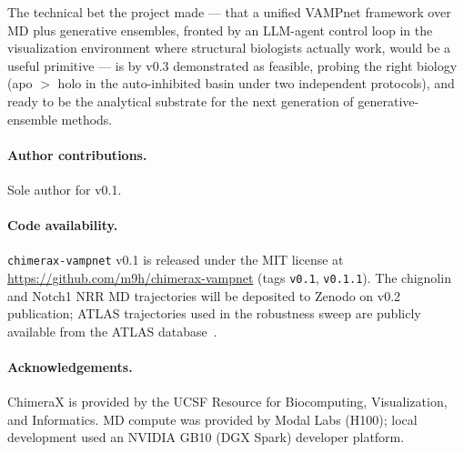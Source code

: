 \documentclass[11pt]{article}
\begin{document}
The technical bet the project made --- that a unified VAMPnet
framework over MD plus generative ensembles, fronted by an LLM-agent
control loop in the visualization environment where structural
biologists actually work, would be a useful primitive --- is by
v0.3 demonstrated as feasible, probing the right biology (apo
$>$ holo in the auto-inhibited basin under two independent
protocols), and ready to be the analytical substrate for the next
generation of generative-ensemble methods.

\paragraph{Author contributions.} Sole author for v0.1.

\paragraph{Code availability.} \texttt{chimerax-vampnet} v0.1 is
released under the MIT license at
\url{https://github.com/m9h/chimerax-vampnet} (tags \texttt{v0.1},
\texttt{v0.1.1}). The chignolin and Notch1 NRR MD trajectories will
be deposited to Zenodo on v0.2 publication; ATLAS trajectories used
in the robustness sweep are publicly available from the ATLAS
database~\cite{vandermeersche2024atlas}.

\paragraph{Acknowledgements.} ChimeraX is provided by the UCSF
Resource for Biocomputing, Visualization, and Informatics. MD
compute was provided by Modal Labs (H100); local development used
an NVIDIA GB10 (DGX Spark) developer platform.



\end{document}
